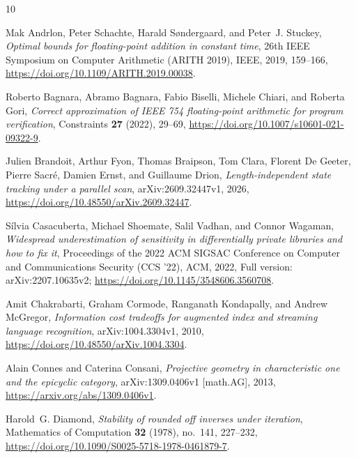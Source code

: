 \documentclass[11pt,reqno]{amsart}
\theoremstyle{definition}
\theoremstyle{remark}
\numberwithin{equation}{section}
\begin{document}

\providecommand{\bysame}{\leavevmode\hbox to3em{\hrulefill}\thinspace}
\providecommand{\MR}{\relax\ifhmode\unskip\space\fi MR }
\providecommand{\MRhref}[2]{%
  \href{http://www.ams.org/mathscinet-getitem?mr=#1}{#2}
}
\providecommand{\href}[2]{#2}
\begin{thebibliography}{10}

Mak Andrlon, Peter Schachte, Harald S{\o}ndergaard, and Peter~J. Stuckey,
  \emph{Optimal bounds for floating-point addition in constant time},
  26th IEEE Symposium on Computer Arithmetic (ARITH 2019), IEEE, 2019,
  159--166, \url{https://doi.org/10.1109/ARITH.2019.00038}.

Roberto Bagnara, Abramo Bagnara, Fabio Biselli, Michele Chiari, and Roberta
  Gori, \emph{Correct approximation of {IEEE 754} floating-point arithmetic for
  program verification}, Constraints \textbf{27} (2022), 29--69,
  \url{https://doi.org/10.1007/s10601-021-09322-9}.

Julien Brandoit, Arthur Fyon, Thomas Braipson, Tom Clara, Florent {De Geeter},
  Pierre Sacr{\'e}, Damien Ernst, and Guillaume Drion, \emph{Length-independent
  state tracking under a parallel scan}, arXiv:2609.32447v1, 2026,
  \url{https://doi.org/10.48550/arXiv.2609.32447}.

S{\'i}lvia Casacuberta, Michael Shoemate, Salil Vadhan, and Connor Wagaman,
  \emph{Widespread underestimation of sensitivity in differentially private
  libraries and how to fix it}, Proceedings of the 2022 {ACM SIGSAC} Conference
  on Computer and Communications Security ({CCS} '22), ACM, 2022, Full version:
  arXiv:2207.10635v2; \url{https://doi.org/10.1145/3548606.3560708}.

Amit Chakrabarti, Graham Cormode, Ranganath Kondapally, and Andrew McGregor,
  \emph{Information cost tradeoffs for augmented index and streaming language
  recognition}, arXiv:1004.3304v1, 2010,
  \url{https://doi.org/10.48550/arXiv.1004.3304}.

Alain Connes and Caterina Consani, \emph{Projective geometry in
  characteristic one and the epicyclic category}, arXiv:1309.0406v1
  [math.AG], 2013, \url{https://arxiv.org/abs/1309.0406v1}.

Harold~G. Diamond, \emph{Stability of rounded off inverses under iteration},
  Mathematics of Computation \textbf{32} (1978), no.~141, 227--232,
  \url{https://doi.org/10.1090/S0025-5718-1978-0461879-7}.


\end{thebibliography}
\end{document}

